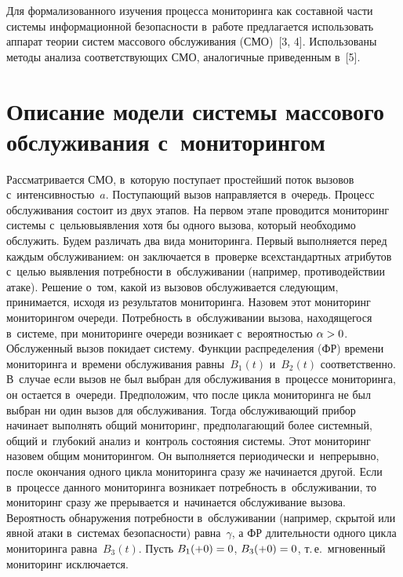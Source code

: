 \begin{multicols}{2}
  
  Для формализованного изучения процесса мониторинга как составной части 
системы ин\-фор\-мационной безопас\-ности в~работе предлагается использо\-вать 
аппарат теории систем массового обслуживания (СМО)~[3, 4]. Использованы 
методы анализа соответствующих СМО, аналогичные приведенным в~[5].

\vspace*{-6pt}
  
  \section{Описание модели системы массового обслуживания 
с~мониторингом} 
  
  Рассматривается СМО, в~которую поступает простейший поток вызовов 
с~интенсивностью~$a$. Поступающий вызов направляется в~очередь. Процесс 
обслуживания состоит из двух этапов. На первом этапе проводится мониторинг 
системы с~целью\linebreak выявления хотя бы одного вызова, который не\-об\-ходимо 
обслужить. Будем различать два вида мониторинга. Первый выполняется перед 
каж\-дым обслуживанием: он заключается в~проверке всех\linebreak стандартных 
атрибутов с~целью выявления потребности в~обслуживании (например, 
противодействии атаке). Решение о~том, какой из вызовов обслуживается 
следующим, принимается, исходя из результатов мониторинга. Назовем этот 
мониторинг мониторингом очереди. По\-треб\-ность в~обслуживании вызова, 
находящегося в~сис\-те\-ме, при мониторинге очереди возникает с~ве\-ро\-ят\-ностью 
$\alpha\hm >0$. Обслуженный вызов покидает сис\-те\-му. Функции 
распределения (ФР) времени мониторинга и~времени обслуживания 
рав\-ны~$B_1(t)$ и~$B_2(t)$ соответственно. В~случае если вызов не был 
выбран для обслуживания в~процессе мониторинга, он остается в~очереди. 
Предположим, что после цикла мониторинга не был выбран ни один вызов для 
обслуживания. Тогда обслуживающий прибор начинает выполнять общий 
мониторинг, предполагающий более системный, общий и~глубокий анализ 
и~контроль состояния системы. Этот мониторинг назовем общим 
мониторингом. Он выполняется периодически и~непрерывно, после окончания 
одного цикла мониторинга сразу же начинается другой. Если в~процессе 
данного мониторинга возникает потребность в~обслуживании, то мониторинг 
сразу же прерывается и~начинается обслуживание вызова. Вероятность 
обнаружения потребности в~обслуживании (например, скрытой или явной атаки 
в~системах безопасности) равна~$\gamma$, а ФР длительности одного цикла 
мониторинга равна~$B_3(t)$. Пусть $B_1(+0)\hm=0$, $B_3(+0)\hm=0$, т.\,е.\ 
мгновенный мониторинг исключается.


\end{multicols}
